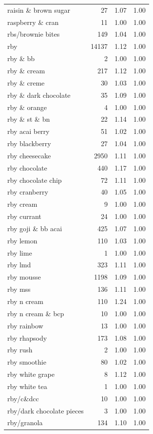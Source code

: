 \begin{table}
\begin{tabular}{lrrr}
raisin \& brown sugar & 27 & 1.07 & 1.00 \\
raspberry \& cran & 11 & 1.00 & 1.00 \\
rbs/brownie bites & 149 & 1.04 & 1.00 \\
rby & 14137 & 1.12 & 1.00 \\
rby \& bb & 2 & 1.00 & 1.00 \\
rby \& cream & 217 & 1.12 & 1.00 \\
rby \& creme & 30 & 1.03 & 1.00 \\
rby \& dark chocolate & 35 & 1.09 & 1.00 \\
rby \& orange & 4 & 1.00 & 1.00 \\
rby \& st \& bn & 22 & 1.14 & 1.00 \\
rby acai berry & 51 & 1.02 & 1.00 \\
rby blackberry & 27 & 1.04 & 1.00 \\
rby cheesecake & 2950 & 1.11 & 1.00 \\
rby chocolate & 440 & 1.17 & 1.00 \\
rby chocolate chip & 72 & 1.11 & 1.00 \\
rby cranberry & 40 & 1.05 & 1.00 \\
rby cream & 9 & 1.00 & 1.00 \\
rby currant & 24 & 1.00 & 1.00 \\
rby goji \& bb acai & 425 & 1.07 & 1.00 \\
rby lemon & 110 & 1.03 & 1.00 \\
rby lime & 1 & 1.00 & 1.00 \\
rby lmd & 323 & 1.11 & 1.00 \\
rby mousse & 1198 & 1.09 & 1.00 \\
rby mss & 136 & 1.11 & 1.00 \\
rby n cream & 110 & 1.24 & 1.00 \\
rby n cream \& bcp & 10 & 1.00 & 1.00 \\
rby rainbow & 13 & 1.00 & 1.00 \\
rby rhapsody & 173 & 1.08 & 1.00 \\
rby rush & 2 & 1.00 & 1.00 \\
rby smoothie & 80 & 1.02 & 1.00 \\
rby white grape & 8 & 1.12 & 1.00 \\
rby white tea & 1 & 1.00 & 1.00 \\
rby/c\&dcc & 10 & 1.00 & 1.00 \\
rby/dark chocolate pieces & 3 & 1.00 & 1.00 \\
rby/granola & 134 & 1.10 & 1.00 \\

\end{tabular}
\end{table}
